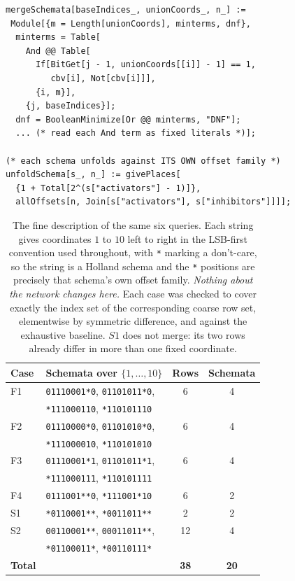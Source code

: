 \documentclass[11pt]{article}
\begin{document}
\begin{lstlisting}[style=MathematicaStyle,caption={Merging the base set into schemata over $C_q$.}]
mergeSchemata[baseIndices_, unionCoords_, n_] :=
 Module[{m = Length[unionCoords], minterms, dnf},
  minterms = Table[
    And @@ Table[
      If[BitGet[j - 1, unionCoords[[i]] - 1] == 1,
         cbv[i], Not[cbv[i]]],
      {i, m}],
    {j, baseIndices}];
  dnf = BooleanMinimize[Or @@ minterms, "DNF"];
  ... (* read each And term as fixed literals *)];

(* each schema unfolds against ITS OWN offset family *)
unfoldSchema[s_, n_] := givePlaces[
  {1 + Total[2^(s["activators"] - 1)]},
  allOffsets[n, Join[s["activators"], s["inhibitors"]]]];
\end{lstlisting}

\begin{table}[h]
\centering
\small
\begin{tabular}{@{}llcc@{}}
\toprule
Case & Schemata over $\{1,\ldots,10\}$ & Rows & Schemata \\
\midrule
F1 & \texttt{01110001*0}, \texttt{01101011*0}, & 6 & 4 \\
   & \texttt{*111000110}, \texttt{*110101110} & & \\
F2 & \texttt{01110000*0}, \texttt{01101010*0}, & 6 & 4 \\
   & \texttt{*111000010}, \texttt{*110101010} & & \\
F3 & \texttt{01110001*1}, \texttt{01101011*1}, & 6 & 4 \\
   & \texttt{*111000111}, \texttt{*110101111} & & \\
F4 & \texttt{0111001**0}, \texttt{*111001*10} & 6 & 2 \\
S1 & \texttt{*0110001**}, \texttt{*0011011**} & 2 & 2 \\
S2 & \texttt{00110001**}, \texttt{00011011**}, & 12 & 4 \\
   & \texttt{*01100011*}, \texttt{*00110111*} & & \\
\midrule
\textbf{Total} & & \textbf{38} & \textbf{20} \\
\bottomrule
\end{tabular}
\caption{The fine description of the same six queries.  Each string gives
coordinates $1$ to $10$ left to right in the LSB-first convention used
throughout, with \texttt{*} marking a don't-care, so the string is a Holland
schema and the \texttt{*} positions are precisely that schema's own offset
family.  \emph{Nothing about the network changes here.}  Each case was checked
to cover exactly the index set of the corresponding coarse row set, elementwise
by symmetric difference, and against the exhaustive baseline.  $S1$ does not
merge: its two rows already differ in more than one fixed coordinate.}
\label{tab:merged-cases}
\end{table}
\end{document}
